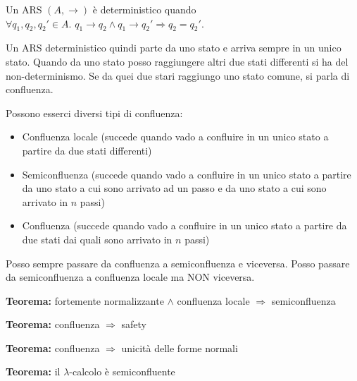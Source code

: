 \documentclass{article}
\begin{document}
\bigskip

Un ARS $(A,\to)$ è {\color{red}deterministico} quando\\ $\forall q_1,q_2,q_2'\in A.\,\,q_1\to q_2\land q_1\to q_2'\Rightarrow q_2 = q_2'$.

\bigskip

Un ARS deterministico quindi parte da uno stato e arriva sempre in un unico stato. Quando da uno stato posso raggiungere altri due stati differenti si ha del non-determinismo. Se da quei due stari raggiungo uno stato comune, si parla di confluenza.

\bigskip

Possono esserci diversi tipi di confluenza:
\begin{itemize}
    \item Confluenza locale (succede quando vado a confluire in un unico stato a partire da due stati differenti)
    \item Semiconfluenza (succede quando vado a confluire in un unico stato a partire da uno stato a cui sono arrivato ad un passo e da uno stato a cui sono arrivato in $n$ passi)
    \item Confluenza (succede quando vado a confluire in un unico stato a partire da due stati dai quali sono arrivato in $n$ passi)
\end{itemize}
Posso sempre passare da confluenza a semiconfluenza e viceversa. Posso passare da semiconfluenza a confluenza locale ma NON viceversa.

\bigskip

\textbf{Teorema:} fortemente normalizzante $\land$ confluenza locale $\Rightarrow$ semiconfluenza

\bigskip

\textbf{Teorema:} confluenza $\Rightarrow$ safety

\bigskip

\textbf{Teorema:} confluenza $\Rightarrow$ unicità delle forme normali

\bigskip

\textbf{Teorema:} il $\lambda$-calcolo è semiconfluente

\bigskip
\end{document}
